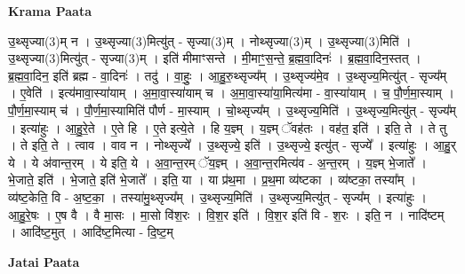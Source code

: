 \documentclass[17pt]{extarticle}
\begin{document}
\textbf{Krama Paata} \newline

उ॒थ्सृज्या(3)म् न । उ॒थ्सृज्या(3)मित्यु॑त् - सृज्या(3)म् । नोथ्सृज्या(3)म् । उ॒थ्सृज्या(3)मिति॑ । उ॒थ्सृज्या(3)मित्यु॑त् - सृज्या(3)म् । इति॑ मीमाꣳसन्ते । मी॒माꣳ॒॒स॒न्ते॒ ब्र॒ह्म॒वा॒दिनः॑ । ब्र॒ह्म॒वा॒दिन॒स्तत् । ब्र॒ह्म॒वा॒दिन॒ इति॑ ब्रह्म - वा॒दिनः॑ । तदु॑ । वा॒हुः॒ । आ॒हु॒रु॒थ्सृज्य᳚म् । उ॒थ्सृज्य॑मे॒व । उ॒थ्सृज्य॒मित्यु॑त् - सृज्य᳚म् । ए॒वेति॑ । इत्य॑मावा॒स्या॑याम् । अ॒मा॒वा॒स्या॑याम् च । अ॒मा॒वा॒स्या॑या॒मित्य॑मा - वा॒स्या॑याम् । च॒ पौ॒र्ण॒मा॒स्याम् । पौ॒र्ण॒मा॒स्याम् च॑ । पौ॒र्ण॒मा॒स्यामिति॑ पौर्ण - मा॒स्याम् । चो॒थ्सृज्य᳚म् । उ॒थ्सृज्य॒मिति॑ । उ॒थ्सृज्य॒मित्यु॑त् - सृज्य᳚म् । इत्या॑हुः । आ॒हु॒रे॒ते । ए॒ते हि । ए॒ते इत्ये॒ते । हि य॒ज्ञ्म् । य॒ज्ञ्म् ॅवह॑तः । वह॑त॒ इति॑ । इति॒ ते । ते तु । ते इति॒ ते । त्वाव । वाव न । नोथ्सृज्ये᳚ । उ॒थ्सृज्ये॒ इति॑ । उ॒थ्सृज्ये॒ इत्यु॑त् - सृज्ये᳚ । इत्या॑हुः । आ॒हु॒र् ये । ये अ॑वान्त॒रम् । ये इति॒ ये । अ॒वा॒न्त॒रम् ॅय॒ज्ञ्म् । अ॒वा॒न्त॒रमित्य॑व - अ॒न्त॒रम् । य॒ज्ञ्म् भे॒जाते᳚ । भे॒जाते॒ इति॑ । भे॒जाते॒ इति॑ भे॒जाते᳚ । इति॒ या । या प्र॑थ॒मा । प्र॒थ॒मा व्य॑ष्टका । व्य॑ष्टका॒ तस्या᳚म् । व्य॑ष्ट॒केति॒ वि - अ॒ष्ट॒का॒ । तस्या॑मु॒थ्सृज्य᳚म् । उ॒थ्सृज्य॒मिति॑ । उ॒थ्सृज्य॒मित्यु॑त् - सृज्य᳚म् । इत्या॑हुः । आ॒हु॒रे॒षः । ए॒ष वै । वै मा॒सः । मा॒सो वि॑श॒रः । वि॒श॒र इति॑ । वि॒श॒र इति॑ वि - श॒रः । इति॒ न । नादि॑ष्टम् । आदि॑ष्ट॒मुत् । आदि॑ष्ट॒मित्या - दि॒ष्ट॒म् \newline

\textbf{Jatai Paata} \newline
\end{document}
